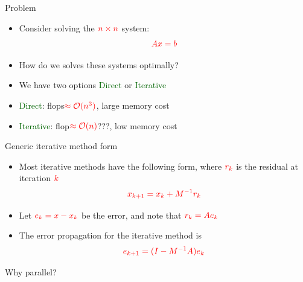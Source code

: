 \documentclass[12pt]{beamer}
\newcommand{\gr}[1]{\textcolor{darkgreen} {#1}}
\newcommand{\re}[1]{{\textcolor{red}       {#1}}}
\begin{document}
\begin{frame}{Problem}
\begin{itemize}
  \item Consider solving the $\re{n\times n}$ system:
  $$\re{Ax = b}$$
  \item How do we solves these systems optimally?
  \pause
  \vspace{2mm}
  \item We have two options \gr{Direct} or \gr{Iterative}
  \item \gr{Direct}: flops$\re{\approx \mathcal{O}(n^3)}$, large memory cost
  \item \gr{Iterative}: flop$\re{\approx \mathcal{O}(n)}$???, low memory cost
\end{itemize}

\end{frame}

\begin{frame}{Generic iterative method form}
\begin{itemize}
  \item Most iterative methods have the following form, where $\re{r_k}$ is the residual at iteration $\re{k}$
  $$\re{x_{k+1} = x_k + M^{-1}r_k}$$
  \item Let $\re{e_k =x - x_k}$ be the error, and note that $\re{r_k = Ae_k}$
  \item The error propagation for the iterative method is
  $$\re{e_{k+1} = (I-M^{-1}A)e_k}$$
\end{itemize}
\end{frame}

\begin{frame}{Why parallel?}


\end{frame}
\end{document}
